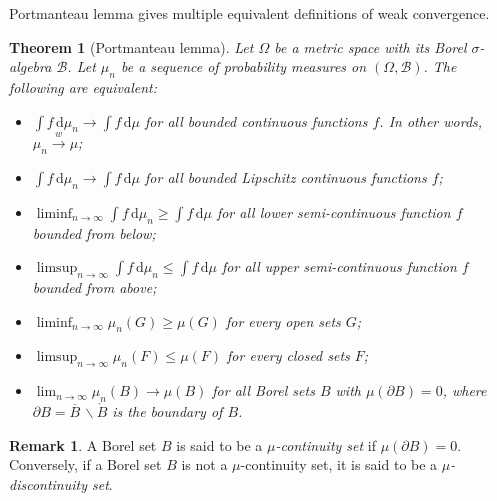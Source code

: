 \documentclass{article}
\numberwithin{equation}{section}
\renewcommand{\d}{\mathrm{d}}
\theoremstyle{plain}
\newtheorem{theorem}{Theorem}[section]
\theoremstyle{definition}
\newtheorem*{remark}{Remark}
\begin{document}
Portmanteau lemma gives multiple equivalent definitions of weak convergence.

\begin{theorem}[Portmanteau lemma]\label{thm:1.77} Let $\Omega$ be a metric space with its Borel $\sigma$-algebra $\mathscr{B}$. Let $\mu_n$ be a sequence of probability measures on $(\Omega,\mathscr{B})$. The following are equivalent:
\begin{itemize}
	\item[(i)] $\int f\,\d \mu_n\to\int f\,\d \mu$ for all bounded continuous functions $f$. In other words, $\mu_n\overset{w}{\to}\mu$;
	\item[(ii)] $\int f\,\d \mu_n\to\int f\,\d \mu$ for all bounded Lipschitz continuous functions $f$;
	\item[(iii)] $\liminf_{n\to\infty}\int f\,\d \mu_n\geq\int f\,\d \mu$ for all lower semi-continuous function $f$ bounded from below;
	\item[(iv)] $\limsup_{n\to\infty}\int f\,\d \mu_n\leq\int f\,\d \mu$ for all upper semi-continuous function $f$ bounded from above;
	\item[(v)] $\liminf_{n\to\infty}\mu_n(G)\geq\mu(G)$ for every open sets $G$;
	\item[(vi)] $\limsup_{n\to\infty}\mu_n(F)\leq\mu(F)$ for every closed sets $F$;
	\item[(vii)] $\lim_{n\to\infty}\mu_n(B)\to\mu(B)$ for all Borel sets $B$ with $\mu(\partial B)=0$, where $\partial B=\overline{B}\,\backslash\mathring{B}$ is the boundary of $B$. 
\end{itemize}
\end{theorem}
\begin{remark}
A Borel set $B$ is said to be a \textit{$\mu$-continuity set} if $\mu(\partial B)=0$. Conversely, if a Borel set $B$ is not a $\mu$-continuity set, it is said to be a \textit{$\mu$-discontinuity set}.
\end{remark}
\end{document}
